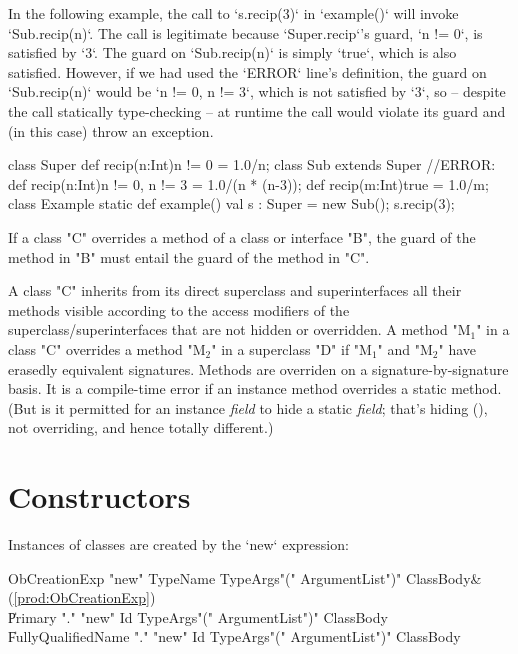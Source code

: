 \begin{ex}
In the following example, the call to \xcd`s.recip(3)` in \xcd`example()`
will invoke \xcd`Sub.recip(n)`.  The call is legitimate because
\xcd`Super.recip`'s guard, \xcd`n != 0`, is satisfied by \xcd`3`.  
The guard on \xcd`Sub.recip(n)` is simply
\xcd`true`, which is also satisfied.  However, if we had used the \xcd`ERROR`
line's definition, the guard on \xcd`Sub.recip(n)` would be \xcd`n != 0, n != 3`, which
is not satisfied by \xcd`3`, so -- despite the call statically type-checking
-- at runtime the call would violate its guard and (in this case) throw an exception.
\begin{xten}
class Super {
  def recip(n:Int){n != 0} = 1.0/n;
}
class Sub extends Super{
  //ERROR: def recip(n:Int){n != 0, n != 3} = 1.0/(n * (n-3));
  def recip(m:Int){true} = 1.0/m;
}
class Example{
  static def example() {
     val s : Super = new Sub();
     s.recip(3);
  }
}
\end{xten}
%

\end{ex}


  If a class \xcd"C" overrides a method of a class or interface
  \xcd"B", the guard of the method in \xcd"B" must entail
  the guard of the method in \xcd"C".


A class \xcd"C" inherits from its direct superclass and superinterfaces all
their methods visible according to the access modifiers
of the superclass/superinterfaces that are not hidden or overridden. A method \xcdmath"M$_1$" in a class
\xcd"C" overrides
a method \xcdmath"M$_2$" in a superclass \xcd"D" if
\xcdmath"M$_1$" and \xcdmath"M$_2$" have erasedly equivalent signatures.
Methods are overriden on a signature-by-signature basis.  It is a compile-time
error if an instance method overrides a static method.  (But is it permitted
for an instance {\em field} to hide a static {\em field}; that's hiding
(), not 
overriding, and hence totally different.)

\section{Constructors}
\label{sect:constructors}

Instances of classes are created by the \xcd`new` expression: \\
\begin{bbgrammar}
       ObCreationExp \: \xcd"new" TypeName TypeArgs\opt \xcd"(" ArgumentList\opt \xcd")" ClassBody\opt & (\ref{prod:ObCreationExp}) \\
                     \| Primary \xcd"." \xcd"new" Id TypeArgs\opt \xcd"(" ArgumentList\opt \xcd")" ClassBody\opt \\
                     \| FullyQualifiedName \xcd"." \xcd"new" Id TypeArgs\opt \xcd"(" ArgumentList\opt \xcd")" ClassBody\opt \\
\end{bbgrammar}

